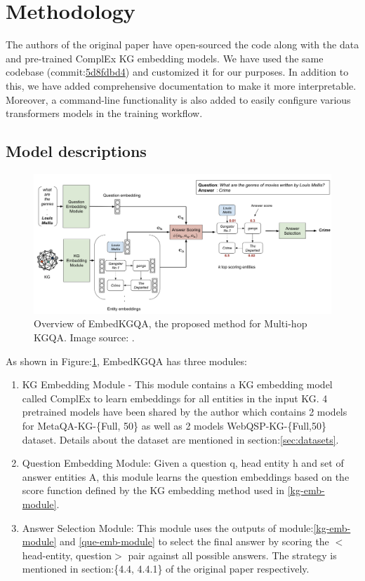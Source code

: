 \section{Methodology}
The authors of the original paper have open-sourced the code along with the data and pre-trained ComplEx KG embedding models. We have used the same codebase (commit:\href{https://github.com/malllabiisc/EmbedKGQA/tree/5d8fdbd4be77fdcb2e67a0dc8a7115844606175a}{5d8fdbd4}) and customized it for our purposes. In addition to this, we have added comprehensive documentation to make it more interpretable. Moreover, a command-line functionality is also added to easily configure various transformers models in the training workflow.

\subsection{Model descriptions}

\begin{figure}
  \centering
  \includegraphics[width=\textwidth]{../openreview/model.png}
  \caption{Overview of EmbedKGQA, the  proposed method for Multi-hop KGQA. Image source:  \cite{saxena-etal-2020-improving}.
}
  \label{model-figure}
\end{figure}


As shown in Figure:\ref{model-figure}, 
EmbedKGQA has three modules: 
\begin{enumerate}
    \item KG Embedding Module\label{kg-emb-module} - This module contains a KG embedding model called ComplEx \cite{ComplEx2016} to learn embeddings for all entities in the input KG. 4 pretrained models have been shared by the author which contains 2 models for MetaQA-KG-\{Full, 50\} as well as 2 models WebQSP-KG-\{Full,50\} dataset. Details about the dataset are mentioned in section:\ref{sec:datasets}.
\item Question Embedding Module\label{que-emb-module}: Given a question q, head entity h and set
of answer entities A, this module learns the question
embeddings based on the score function defined by the KG embedding method used in \ref{kg-emb-module}. 
\item Answer Selection Module: This module uses the outputs of module:\ref{kg-emb-module} and \ref{que-emb-module} to select the final answer by scoring the $<$head-entity, question$>$
pair against all possible answers. The strategy is mentioned in section:\{4.4, 4.4.1\} of the original paper respectively.
\end{enumerate}

